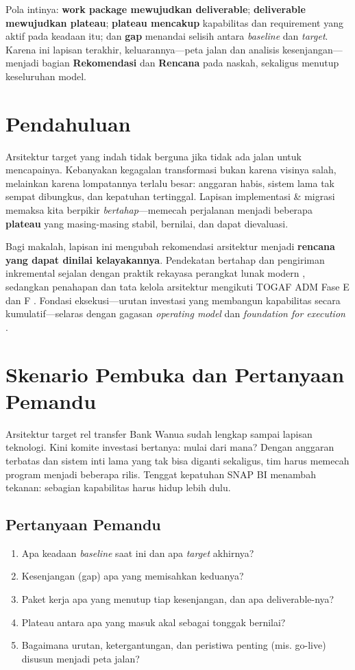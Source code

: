 Pola intinya: \textbf{work package mewujudkan deliverable}; \textbf{deliverable
mewujudkan plateau}; \textbf{plateau mencakup} kapabilitas dan requirement yang
aktif pada keadaan itu; dan \textbf{gap} menandai selisih antara \emph{baseline}
dan \emph{target}. Karena ini lapisan terakhir, keluarannya---peta jalan dan
analisis kesenjangan---menjadi bagian \textbf{Rekomendasi} dan \textbf{Rencana}
pada naskah, sekaligus menutup keseluruhan model.

\section{Pendahuluan}

Arsitektur target yang indah tidak berguna jika tidak ada jalan untuk mencapainya.
Kebanyakan kegagalan transformasi bukan karena visinya salah, melainkan karena
lompatannya terlalu besar: anggaran habis, sistem lama tak sempat dibungkus, dan
kepatuhan tertinggal. Lapisan implementasi \& migrasi memaksa kita berpikir
\emph{bertahap}---memecah perjalanan menjadi beberapa \textbf{plateau} yang
masing-masing stabil, bernilai, dan dapat dievaluasi.

Bagi makalah, lapisan ini mengubah rekomendasi arsitektur menjadi \textbf{rencana
yang dapat dinilai kelayakannya}. Pendekatan bertahap dan pengiriman inkremental
sejalan dengan praktik rekayasa perangkat lunak modern \cite{newman2021building},
sedangkan penahapan dan tata kelola arsitektur mengikuti TOGAF ADM Fase E dan F
\cite{togaf10}. Fondasi eksekusi---urutan investasi yang membangun kapabilitas
secara kumulatif---selaras dengan gagasan \emph{operating model} dan
\emph{foundation for execution} \cite{ross2006enterprise}.

\section{Skenario Pembuka dan Pertanyaan Pemandu}

Arsitektur target rel transfer Bank Wanua sudah lengkap sampai lapisan teknologi.
Kini komite investasi bertanya: mulai dari mana? Dengan anggaran terbatas dan
sistem inti lama yang tak bisa diganti sekaligus, tim harus memecah program
menjadi beberapa rilis. Tenggat kepatuhan SNAP BI menambah tekanan: sebagian
kapabilitas harus hidup lebih dulu.

\subsection*{Pertanyaan Pemandu}
\begin{enumerate}
  \item Apa keadaan \emph{baseline} saat ini dan apa \emph{target} akhirnya?
  \item Kesenjangan (gap) apa yang memisahkan keduanya?
  \item Paket kerja apa yang menutup tiap kesenjangan, dan apa deliverable-nya?
  \item Plateau antara apa yang masuk akal sebagai tonggak bernilai?
  \item Bagaimana urutan, ketergantungan, dan peristiwa penting (mis. go-live)
        disusun menjadi peta jalan?
\end{enumerate}

